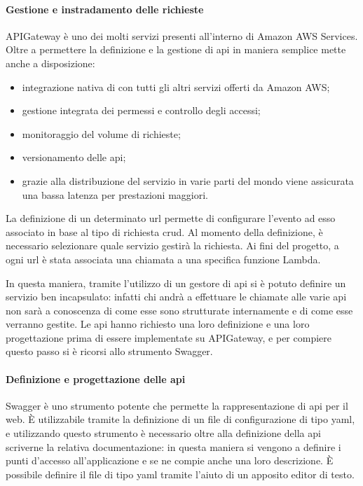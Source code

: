 \paragraph*{Gestione e instradamento delle richieste}
APIGateway è uno dei molti servizi presenti all'interno di Amazon AWS Services.
Oltre a permettere la definizione e la gestione di \gls{api} in maniera
semplice mette anche a disposizione:
\begin{itemize}
  \item integrazione nativa di con tutti gli altri servizi offerti da Amazon
AWS;
  \item gestione integrata dei permessi e controllo degli accessi;
  \item monitoraggio del volume di richieste;
  \item versionamento delle \gls{api};
  \item grazie alla distribuzione del servizio in varie parti del mondo viene
assicurata una bassa latenza per prestazioni maggiori.
\end{itemize}
La definizione di un determinato \gls{url} permette di configurare l'evento ad
esso associato in base al tipo di richiesta \gls{crud}. Al momento della
definizione, è necessario selezionare quale servizio gestirà la richiesta. Ai
fini del progetto, a ogni \gls{url} è stata associata una chiamata a una
specifica funzione Lambda.

In questa maniera, tramite l'utilizzo di un gestore di \gls{api} si è potuto
definire un servizio  ben incapsulato: infatti
chi andrà a effettuare le chiamate alle varie \gls{api} non sarà a conoscenza di
come esse sono strutturate internamente e di come esse verranno gestite.
Le \gls{api} hanno richiesto una loro definizione e una loro progettazione
prima di essere implementate su APIGateway, e per compiere questo passo si è
ricorsi allo strumento Swagger.


\paragraph*{Definizione e progettazione delle \gls{api}}
Swagger è uno strumento potente che permette la rappresentazione di \gls{api}
per il web. È utilizzabile tramite la definizione di un file di configurazione
di tipo \gls{yaml}, e utilizzando questo strumento è necessario oltre alla
definizione della \gls{api} scriverne la relativa documentazione: in questa
maniera si vengono a definire i punti d'accesso all'applicazione e se ne compie
anche una loro descrizione. È possibile definire il file di tipo \gls{yaml}
tramite l'aiuto di un apposito editor di testo.

